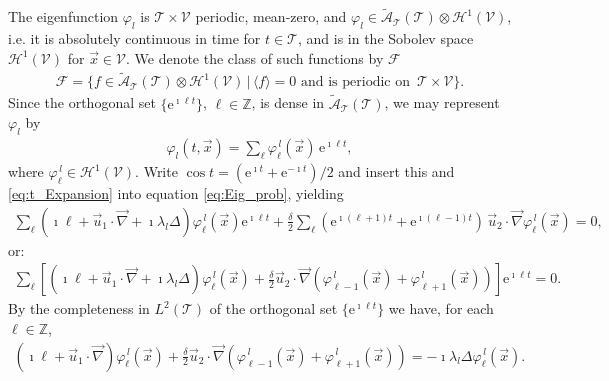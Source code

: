\documentclass[11pt]{amsart}
\newcommand{\e}{\mathrm{e}}
\newcommand{\Tc}{\mathcal{T}}
\newcommand{\Vc}{\mathcal{V}}
\newcommand{\Hc}{\mathcal{H}}
\newcommand{\Fc}{\mathcal{F}}
\newcommand{\As}{\mathscr{A}}
\begin{document}
The eigenfunction $\varphi_l$ is $\Tc\times\Vc$ periodic, mean-zero, and
$\varphi_l\in\tilde{\As}_{\Tc}(\Tc)\otimes\Hc^1(\Vc)$,
i.e. it is absolutely continuous in time
for $t\in\Tc$, and is in the Sobolev space $\Hc^1(\Vc)$ for
$\vec{x}\in\Vc$. We denote the class of such functions by $\Fc$
%
\begin{align}\label{eq:F}
  \Fc=\{f\in\tilde{\As}_{\Tc}(\Tc)\otimes\Hc^1(\Vc)\,|\, \langle f\rangle=0  \text{ and is periodic on }
  \, \Tc\times\Vc\}. 
\end{align}
%
Since the orthogonal set $\{\e^{\imath\ell t}\}$,
${\ell\in\mathbb{Z}}$, is dense in $\tilde{\As}_{\Tc}(\Tc)$, we may represent $\varphi_l$ by 
%
\begin{align}\label{eq:t_Expansion}
  \varphi_l(t,\vec{x})=\sum_\ell\varphi_\ell^{\,l}(\vec{x})\,\e^{\imath \ell t},
\end{align}
%
where $\varphi_\ell^{\,l}\in\Hc^1(\Vc)$. Write $\cos{t}=(\e^{\imath t}+\e^{-\imath t})/2$ and insert
this and \eqref{eq:t_Expansion} into equation \eqref{eq:Eig_prob},
yielding   
%
\begin{align}
  \sum_\ell(\imath \ell + \vec{u}_1\cdot\vec{\nabla}+\imath\lambda_l\Delta)\varphi_\ell^{\,l}(\vec{x})\e^{\imath \ell t}
 +\frac{\delta}{2}\sum_\ell(\e^{\imath(\ell+1)t}+\e^{\imath(\ell-1)t})\,\vec{u}_2\cdot\vec{\nabla}\varphi_\ell^{\,l}(\vec{x})=0,
\end{align}
%
or:
%
\begin{align}
  \sum_\ell\left[(\imath \ell + \vec{u}_1\cdot\vec{\nabla}+\imath\lambda_l\Delta)\varphi_\ell^{\,l}(\vec{x})
 +\frac{\delta}{2}\vec{u}_2\cdot\vec{\nabla}(\varphi^{\,l}_{\ell-1}(\vec{x})+\varphi^{\,l}_{\ell+1}(\vec{x}))\right]\e^{\imath \ell t}=0.
\end{align}
%
By the completeness in $L^2(\Tc)$ of the orthogonal set $\{\e^{\imath \ell t}\}$ we
have, for each $\ell\in\mathbb{Z}$, 
%
\begin{align}\label{eq:Eig_prob_shift}
  (\imath \ell + \vec{u}_1\cdot\vec{\nabla})\varphi_\ell^{\,l}(\vec{x})
 +\frac{\delta}{2}\vec{u}_2\cdot\vec{\nabla}(\varphi_{\ell-1}^{\,l}(\vec{x})+\varphi_{\ell+1}^{\,l}(\vec{x}))
 =-\imath\lambda_l\Delta\varphi_\ell^{\,l}(\vec{x}).
\end{align}
%
\end{document}
